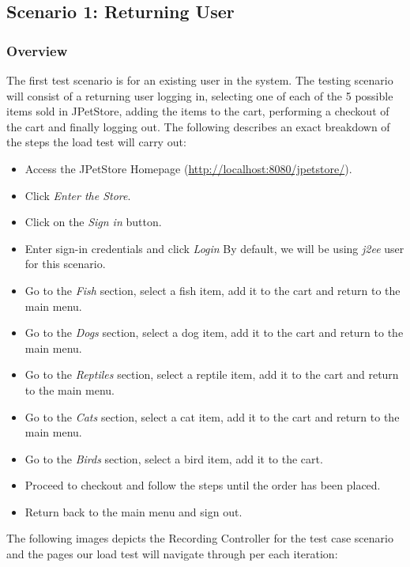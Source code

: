 \documentclass[fontsize=12pt,paper=letter,twoside]{scrartcl}
\begin{document}
\newpage
\subsection{Scenario 1: Returning User}

\subsubsection{Overview}
The first test scenario is for an existing user in the system. The testing scenario will consist of a returning user logging in, selecting one of each of the 5 possible items sold in JPetStore, adding the items to the cart, performing a checkout of the cart and finally logging out. The following describes an exact breakdown of the steps the load test will carry out:

\begin{itemize}
\item Access the JPetStore Homepage (\url{http://localhost:8080/jpetstore/}).
\item Click \emph{Enter the Store}.
\item Click on the \emph{Sign in} button.
\item Enter sign-in credentials and click \emph{Login} By default, we will be using \emph{j2ee} user for this scenario.
\item Go to the \emph{Fish} section, select a fish item, add it to the cart and return to the main menu.
\item Go to the \emph{Dogs} section, select a dog item, add it to the cart and return to the main menu.
\item Go to the \emph{Reptiles} section, select a reptile item, add it to the cart and return to the main menu.
\item Go to the \emph{Cats} section, select a cat item, add it to the cart and return to the main menu.
\item Go to the \emph{Birds} section, select a bird item, add it to the cart.
\item Proceed to checkout and follow the steps until the order has been placed.
\item Return back to the main menu and sign out.
\end{itemize}

\newpage
\bigskip
\noindent The following images depicts the Recording Controller for the test case scenario and the pages our load test will navigate through per each iteration:
\end{document}
